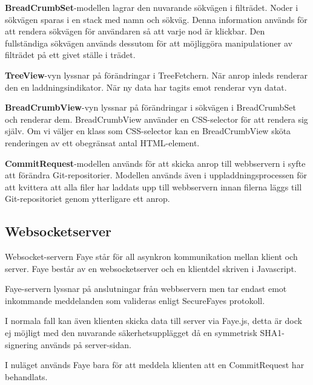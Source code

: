 {\bf BreadCrumbSet}-modellen lagrar den nuvarande sökvägen i filträdet. Noder i sökvägen sparas i en stack med namn och sökväg. Denna information används för att rendera sökvägen för användaren så att varje nod är klickbar. Den fullständiga sökvägen används dessutom för att möjliggöra manipulationer av filträdet på ett givet ställe i trädet.

{\bf TreeView}-vyn lyssnar på förändringar i TreeFetchern. När anrop inleds renderar den en laddningsindikator. När ny data har tagits emot renderar vyn datat.

{\bf BreadCrumbView}-vyn lyssnar på förändringar i sökvägen i BreadCrumbSet och renderar dem. BreadCrumbView använder en CSS-selector för att rendera sig själv. Om vi väljer en klass som CSS-selector kan en BreadCrumbView sköta renderingen av ett obegränsat antal HTML-element.

{\bf CommitRequest}-modellen används för att skicka anrop till webbservern i syfte att förändra Git-repositorier. Modellen används även i uppladdningsprocessen för att kvittera att alla filer har laddats upp till webbservern innan filerna läggs till Git-repositoriet genom ytterligare ett anrop.

\subsection{Websocketserver}
Websocket-servern Faye står för all asynkron kommunikation mellan klient och server. Faye består av en websocketserver och en klientdel skriven i Javascript.

Faye-servern lyssnar på anslutningar från webbservern men tar endast emot inkommande meddelanden som valideras enligt SecureFayes protokoll.

I normala fall kan även klienten skicka data till server via Faye.js, detta är dock ej möjligt med den nuvarande säkerhetsupplägget då en symmetrisk SHA1-signering används på server-sidan.

I nuläget används Faye bara för att meddela klienten att en CommitRequest har behandlats.

